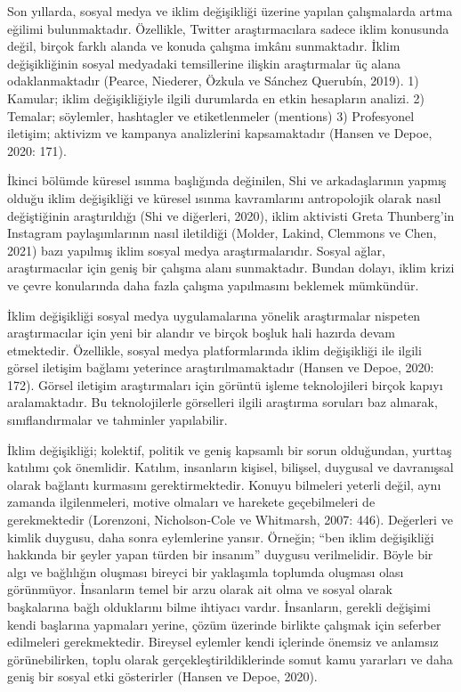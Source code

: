 \documentclass[
]{book}
\begin{document}
Son yıllarda, sosyal medya ve iklim değişikliği üzerine yapılan çalışmalarda artma eğilimi bulunmaktadır. Özellikle, Twitter araştırmacılara sadece iklim konusunda değil, birçok farklı alanda ve konuda çalışma imkânı sunmaktadır. İklim değişikliğinin sosyal medyadaki temsillerine ilişkin araştırmalar üç alana odaklanmaktadır (Pearce, Niederer, Özkula ve Sánchez Querubín, 2019). 1) Kamular; iklim değişikliğiyle ilgili durumlarda en etkin hesapların analizi. 2) Temalar; söylemler, hashtagler ve etiketlenmeler (mentions) 3) Profesyonel iletişim; aktivizm ve kampanya analizlerini kapsamaktadır (Hansen ve Depoe, 2020: 171).

İkinci bölümde küresel ısınma başlığında değinilen, Shi ve arkadaşlarının yapmış olduğu iklim değişikliği ve küresel ısınma kavramlarını antropolojik olarak nasıl değiştiğinin araştırıldığı (Shi ve diğerleri, 2020), iklim aktivisti Greta Thunberg'in Instagram paylaşımlarının nasıl iletildiği (Molder, Lakind, Clemmons ve Chen, 2021) bazı yapılmış iklim sosyal medya araştırmalarıdır. Sosyal ağlar, araştırmacılar için geniş bir çalışma alanı sunmaktadır. Bundan dolayı, iklim krizi ve çevre konularında daha fazla çalışma yapılmasını beklemek mümkündür.

İklim değişikliği sosyal medya uygulamalarına yönelik araştırmalar nispeten araştırmacılar için yeni bir alandır ve birçok boşluk hali hazırda devam etmektedir. Özellikle, sosyal medya platformlarında iklim değişikliği ile ilgili görsel iletişim bağlamı yeterince araştırılmamaktadır (Hansen ve Depoe, 2020: 172). Görsel iletişim araştırmaları için görüntü işleme teknolojileri birçok kapıyı aralamaktadır. Bu teknolojilerle görselleri ilgili araştırma soruları baz alınarak, sınıflandırmalar ve tahminler yapılabilir.

İklim değişikliği; kolektif, politik ve geniş kapsamlı bir sorun olduğundan, yurttaş katılımı çok önemlidir. Katılım, insanların kişisel, bilişsel, duygusal ve davranışsal olarak bağlantı kurmasını gerektirmektedir. Konuyu bilmeleri yeterli değil, aynı zamanda ilgilenmeleri, motive olmaları ve harekete geçebilmeleri de gerekmektedir (Lorenzoni, Nicholson-Cole ve Whitmarsh, 2007: 446). Değerleri ve kimlik duygusu, daha sonra eylemlerine yansır. Örneğin; ``ben iklim değişikliği hakkında bir şeyler yapan türden bir insanım'' duygusu verilmelidir. Böyle bir algı ve bağlılığın oluşması bireyci bir yaklaşımla toplumda oluşması olası görünmüyor. İnsanların temel bir arzu olarak ait olma ve sosyal olarak başkalarına bağlı olduklarını bilme ihtiyacı vardır. İnsanların, gerekli değişimi kendi başlarına yapmaları yerine, çözüm üzerinde birlikte çalışmak için seferber edilmeleri gerekmektedir. Bireysel eylemler kendi içlerinde önemsiz ve anlamsız görünebilirken, toplu olarak gerçekleştirildiklerinde somut kamu yararları ve daha geniş bir sosyal etki gösterirler (Hansen ve Depoe, 2020).
\end{document}
